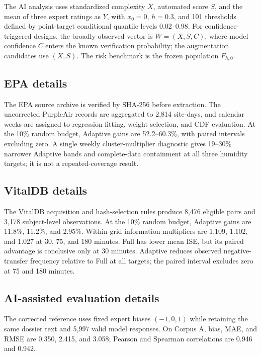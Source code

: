 The AI analysis uses standardized complexity \(X\), automated score \(S\),
and the mean of three expert ratings as \(Y\), with \(x_0=0\), \(h=0.3\),
and 101 thresholds defined by point-target conditional quantile levels
0.02--0.98. For confidence-triggered designs, the broadly observed vector is
\(W=(X,S,C)\), where model confidence \(C\) enters the known verification
probability; the augmentation candidates use \((X,S)\). The risk benchmark is
the frozen population \(F_{h,0}\).

\subsection{EPA details}

The EPA source archive is verified by SHA-256 before extraction. The
uncorrected PurpleAir records are aggregated to 2,814 site-days, and calendar
weeks are assigned to regression fitting, weight selection, and CDF evaluation.
At the 10\% random budget, Adaptive gains
are 52.2--60.3\%, with paired intervals excluding zero. A single weekly
cluster-multiplier diagnostic gives 19--30\% narrower Adaptive bands and
complete-data containment at all three humidity targets; it is not a
repeated-coverage result.

\subsection{VitalDB details}

The VitalDB acquisition and hash-selection rules produce 8,476 eligible pairs
and 3,178 subject-level observations. At the 10\% random budget, Adaptive gains
are 11.8\%, 11.2\%, and 2.95\%. Within-grid information multipliers are 1.109,
1.102, and 1.027 at 30, 75, and 180 minutes. Full has lower mean ISE, but its
paired advantage is conclusive only at 30 minutes. Adaptive reduces observed
negative-transfer frequency relative to Full at all targets; the paired
interval excludes zero at 75 and 180 minutes.

\subsection{AI-assisted evaluation details}

The corrected reference uses fixed expert biases $(-1,0,1)$ while retaining
the same dossier text and 5,997 valid model responses. On Corpus A, bias,
MAE, and RMSE are 0.350, 2.415, and 3.058; Pearson and Spearman correlations
are 0.946 and 0.942.

